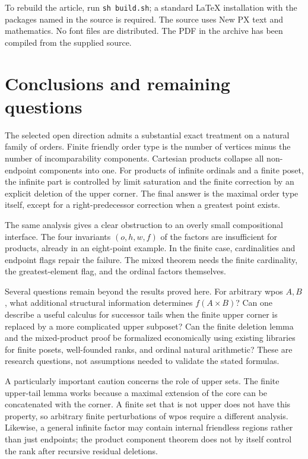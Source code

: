 \documentclass[11pt,letterpaper]{article}
\theoremstyle{definition}
\theoremstyle{remark}
\begin{document}
To rebuild the article, run \texttt{sh build.sh}; a standard LaTeX
installation with the packages named in the source is required. The
source uses New PX text and mathematics. No font files are distributed.
The PDF in the archive has been compiled from the supplied source.

\section{Conclusions and remaining questions}\label{sec:conclusion}

The selected open direction admits a substantial exact treatment on a
natural family of orders. Finite friendly order type is the number of
vertices minus the number of incomparability components. Cartesian
products collapse all non-endpoint components into one. For products of
infinite ordinals and a finite poset, the infinite part is controlled by
limit saturation and the finite correction by an explicit deletion of
the upper corner. The final answer is the maximal order type itself,
except for a right-predecessor correction when a greatest point exists.

The same analysis gives a clear obstruction to an overly small
compositional interface. The four invariants $(o,h,w,f)$ of the factors
are insufficient for products, already in an eight-point example. In the
finite case, cardinalities and endpoint flags repair the failure. The
mixed theorem needs the finite cardinality, the greatest-element flag,
and the ordinal factors themselves.

Several questions remain beyond the results proved here. For arbitrary
wpos $A,B$, what additional structural information determines
$f(A\times B)$? Can one describe a useful calculus for successor tails
when the finite upper corner is replaced by a more complicated upper
subposet? Can the finite deletion lemma and the mixed-product proof be
formalized economically using existing libraries for finite posets,
well-founded ranks, and ordinal natural arithmetic? These are research
questions, not assumptions needed to validate the stated formulas.

A particularly important caution concerns the role of upper sets. The
finite upper-tail lemma works because a maximal extension of the core
can be concatenated with the corner. A finite set that is not upper does
not have this property, so arbitrary finite perturbations of wpos require
a different analysis. Likewise, a general infinite factor may contain
internal friendless regions rather than just endpoints; the product
component theorem does not by itself control the rank after recursive
residual deletions.
\end{document}
